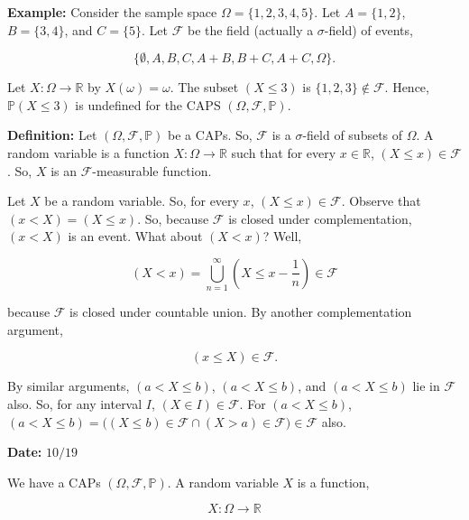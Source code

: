 \documentclass[12pt]{article}
\newcommand{\R}{\mathbb{R}}
\newcommand{\faps}{(\Omega, \field, \mathbb{P})}
\newcommand{\field}{\mathcal{F}}
\newcommand{\prob}[1]{\mathbb{P}(#1)}
\newcommand{\nspace}{\vspace*{.5cm}}
\begin{document}
\noindent
\textbf{Example:} Consider the sample space $\Omega = \{ 1,2,3,4,5 \}$. Let $A=\{ 1,2 \}$, $B =\{ 3,4 \}$, and $C =\{ 5 \}$. Let $\field$ be the field (actually a $\sigma$-field) of events,

\begin{equation*}
\big \{ \emptyset, A, B, C, A+B, B+C, A+C, \Omega \big \}.
\end{equation*}

\noindent
Let $X : \Omega \rightarrow \R$ by $X(\omega) = \omega$. The subset $(X \leq 3)$ is $\{ 1,2,3 \} \not \in \field$. Hence, $\prob{X \leq 3}$ is undefined for the CAPS $\faps$.

\nspace
\noindent
\textbf{Definition:} Let $\faps$ be a CAPs. So, $\field$ is a $\sigma$-field of subsets of $\Omega$. A random variable is a function $X : \Omega \rightarrow \R$ such that for every $x \in \R$, $(X \leq x) \in \field$. So, $X$ is an $\field$-measurable function. 

\noindent
Let $X$ be a random variable. So, for every $x$, $(X \leq x) \in \field$. Observe that $(x < X) = (X \leq x)$. So, because $\field$ is closed under complementation, $(x < X)$ is an event. What about $(X < x)$? Well,

\begin{equation*}
(X < x) = \bigcup_{n=1}^{\infty} (X \leq x - \frac{1}{n}) \in \field
\end{equation*}

\noindent
because $\field$ is closed under countable union. By another complementation argument,  

\begin{equation}
(x \leq X) \in \field.
\end{equation}

\noindent
By similar arguments, $(a < X \leq b)$, $(a < X \leq b)$, and $(a < X \leq b)$ lie in $\field$ also. So, for any interval $I$, $(X \in I) \in \field$. For $(a < X \leq b)$,
$(a < X \leq b) = \big ( (X \leq b) \in \field \cap (X > a) \in \field \big ) \in \field$ also.

\begin{flushright}
\textbf{Date:} $10/19$
\end{flushright}

\nspace
\noindent
We have a CAPs $\faps$. A random variable $X$ is a function, 

\begin{equation*}
X: \Omega \rightarrow \R
\end{equation*}
\end{document}
